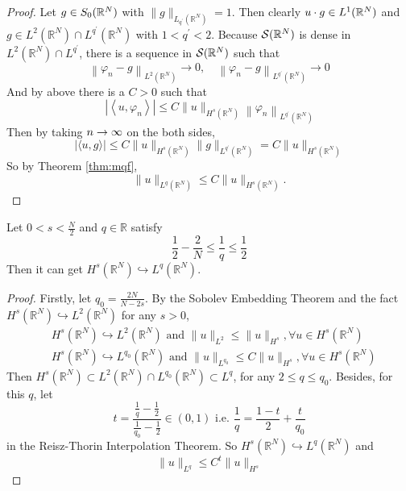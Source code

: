 \begin{proof}
	\noindent Let $g \in S_0(\mathbb{R}^N)$ with $\|g\|_{L_{q^{\prime}}\left(\mathbb{R}^N\right)}=1$. Then clearly $u\cdot g \in L^1(\mathbb{R}^N)$ and $g \in L^2\left(\mathbb{R}^N\right) \cap L^{q^{\prime}}\left(\mathbb{R}^N\right)$ with $1 < q^\prime < 2$. Because $\mathcal{S}(\mathbb{R}^N)$ is dense in $L^2\left(\mathbb{R}^N\right) \cap L^{q^{\prime}}$, there is a sequence in $\mathcal{S}(\mathbb{R}^N)$ such that
	\begin{equation*}
		\left\|\varphi_n-g\right\|_{L^2\left(\mathbb{R}^N\right)} \rightarrow 0, \quad\left\|\varphi_n-g\right\|_{L^{q^{\prime}}\left(\mathbb{R}^N\right)} \rightarrow 0
	\end{equation*}
	And by above there is a $C> 0$ such that
	\begin{equation*}
		\left|\left\langle u, \varphi_n\right\rangle\right| \leq C\|u\|_{H^s\left(\mathbb{R}^N\right)}\left\|\varphi_n\right\|_{L^{q^{\prime}}\left(\mathbb{R}^N\right)}
	\end{equation*}
	Then by taking $n \rightarrow \infty$ on the both sides,
	\begin{equation*}
		|\langle u, g\rangle| \leq C\|u\|_{H^s\left(\mathbb{R}^N\right)}\|g\|_{L^{q^{\prime}}\left(\mathbb{R}^N\right)}=C\|u\|_{H^s\left(\mathbb{R}^N\right)}
	\end{equation*}
	So by Theorem \ref{thm:mqf},
	\begin{equation*}
		\|u\|_{L^q\left(\mathbb{R}^N\right)} \leq C\|u\|_{H^s\left(\mathbb{R}^N\right)}.
	\end{equation*}
\end{proof}

\begin{cor}
	Let $0<s<\frac{N}{2}$ and $q \in \mathbb{R}$ satisfy
	$$
	\frac{1}{2}-\frac{2}{N} \leqslant \frac{1}{q} \leqslant \frac{1}{2}
	$$
	Then it can get $H^s\left(\mathbb{R}^N\right) \hookrightarrow L^q\left(\mathbb{R}^N\right)$.
\end{cor}
\begin{proof}
	Firstly, let $q_0=\frac{2 N}{N-2 s}$. By the Sobolev Embedding Theorem and the fact $H^s\left(\mathbb{R}^N\right) \hookrightarrow L^2\left(\mathbb{R}^N\right)$ for any $s>0$,
	$$
	\begin{aligned}
	& H^s\left(\mathbb{R}^N\right) \hookrightarrow L^2\left(\mathbb{R}^N\right) \text { and }\|u\|_{L^2} \leqslant\|u\|_{H^s}, \forall u \in H^s\left(\mathbb{R}^N\right) \\
	& H^s\left(\mathbb{R}^N\right) \hookrightarrow L^{q_0}\left(\mathbb{R}^N\right) \text { and }\|u\|_{L^{q_0}} \leqslant C\|u\|_{H^s}, \forall u \in H^s\left(\mathbb{R}^N\right)
	\end{aligned}
	$$
	Then $H^s\left(\mathbb{R}^N\right) \subset L^2\left(\mathbb{R}^N\right) \cap L^{q_0}\left(\mathbb{R}^N\right) \subset L^q$, for any $2 \leqslant q \leqslant q_0$. Besides, for this $q$, let
	$$
	t=\frac{\frac{1}{q}-\frac{1}{2}}{\frac{1}{q_0}-\frac{1}{2}} \in(0,1) \text { i.e. } \frac{1}{q}=\frac{1-t}{2}+\frac{t}{q_0}
	$$
	in the Reisz-Thorin Interpolation Theorem. So $H^s\left(\mathbb{R}^N\right) \hookrightarrow L^q\left(\mathbb{R}^N\right)$ and
	$$
	\|u\|_{L^q} \leqslant C^t\|u\|_{H^s}
	$$
\end{proof}
